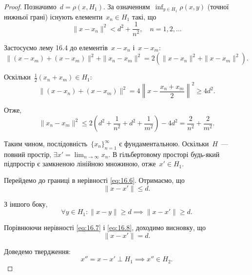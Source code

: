 \begin{proof}
    Позначимо~$d = \rho(x, H_1)$. За означенням~$\inf_{y \in H_1} \rho(x, y)$ (точної нижньої грані) існують елементи~$x_n \in H_1$ такі, що
    \begin{equation}
        \label{eq:16.6}
        \|x - x_n\|^2 < d^2 + \frac{1}{n^2}, \quad n = 1, 2, \dots
    \end{equation}
    
    Застосуємо лему 16.4 до елементів~$x - x_n$ і~$x - x_m$:
    \begin{equation*}
        \|(x - x_m) + (x - x_m)\|^2 + \|x_n - x_m\|^2 =
        2 (\|x - x_n\|^2 + \|x - x_m\|^2).
    \end{equation*}
    
    Оскільки~$\frac{1}{2}(x_n + x_m) \in H_1$:
    \begin{equation*}
        \|(x - x_n) + (x - x_m)\|^2 =
        4 \left\| x - \frac{x_n + x_m}{2} \right\|^2 \ge
        4 d^2.
    \end{equation*}
    
    Отже,
    \begin{equation*}
        \|x_n - x_m\|^2 \le
        2 \left(d^2 + \frac{1}{n^2} + d^2 + \frac{1}{m^2} \right) - 4 d^2 =
        \frac{2}{n^2} + \frac{2}{m^2}.
    \end{equation*}
    
    Таким чином, послідовність~$\{x_n\}_{n = 1}^\infty$ є фундаментальною. Оскільки~$H$~--- повний простір, $\exists x' = \lim_{n \to \infty} x_n$. В гільбертовому просторі будь-який підпростір є замкненою лінійною множиною, отже~$x' \in H_1$.
    
    Перейдемо до границі в нерівності \eqref{eq:16.6}. Отримаємо, що
    \begin{equation}
        \label{eq:16.7}
        \|x - x'\| \le d.
    \end{equation}
    
    З іншого боку,
    \begin{equation}
        \label{eq:16.8}
        \forall y \in H_1: \|x - y\| \ge d \implies \|x - x'\| \ge d.
    \end{equation}
    
    Порівнюючи нерівності \eqref{eq:16.7} і \eqref{eq:16.8}, доходимо висновку, що
    \begin{equation*}
        \|x - x'\| = d.
    \end{equation*}
    
    Доведемо твердження:
    \begin{equation*}
        x'' = x - x' \perp H_1 \implies x'' \in H_2.
    \end{equation*}
    

\end{proof}
